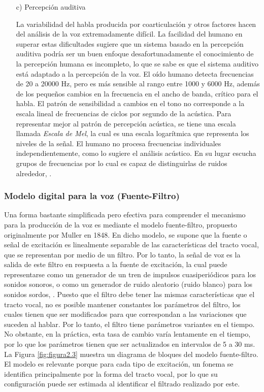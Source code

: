 \begin{enumerate}
\newpage
\item[c)]Percepción auditiva
\par
La variabilidad del habla producida por coarticulación y otros factores hacen del análisis de la voz extremadamente difícil.
\vskip 0.5cm
La facilidad del humano en superar estas dificultades sugiere que un sistema basado en la percepción auditiva podría ser un buen enfoque desafortunadamente el conocimiento de la percepción humana es incompleto, lo que se sabe es que el sistema auditivo está adaptado a la percepción de la voz.
\vskip 0.5cm
El oído humano detecta frecuencias de 20 a 20000 Hz, pero es más sensible al rango entre 1000 y 6000 Hz, además de los pequeños cambios en la frecuencia en el ancho de banda, crítico para el habla. El patrón de sensibilidad a cambios en el tono no corresponde a la escala lineal de frecuencias de ciclos por segundo de la acústica. Para representar mejor al patrón de percepción acústica, se tiene una escala llamada \textit{Escala de Mel}, la cual es una escala logarítmica que representa los niveles de la señal.
\vskip 0.5cm
El humano no procesa frecuencias individuales independientemente, como lo sugiere el análisis acústico. En su lugar escucha grupos de frecuencias por lo cual es capaz de distinguirlas de ruidos alrededor, \cite{eyra}.
\end{enumerate}

\subsubsection{Modelo digital para la voz (Fuente-Filtro)}
Una forma bastante simplificada pero efectiva para comprender el mecanismo para la producción de la voz es mediante el modelo fuente-filtro, propuesto originalmente por Muller en 1848. En dicho modelo, se supone que la fuente o señal de excitación es linealmente separable de las características del tracto vocal, que se representan por medio de un filtro. Por lo tanto, la señal de voz es la salida de este filtro en respuesta a la fuente de excitación, la cual puede representarse como un generador de un tren de impulsos cuasiperiódicos para los sonidos sonoros, o como un generador de ruido aleatorio (ruido blanco) para los sonidos sordos, \cite{rowden}.
\vskip 0.5cm
Puesto que el filtro debe tener las mismas características que el tracto vocal, no es posible mantener constantes los parámetros del filtro, los cuales tienen que ser modificados para que correspondan a las variaciones que suceden al hablar. Por lo tanto, el filtro tiene parámetros variantes en el tiempo. No obstante, en la práctica, esta tasa de cambio varía lentamente en el tiempo, por lo que los parámetros tienen que ser actualizados en intervalos de 5 a 30 ms.
\vskip 0.5cm
La Figura \ref{fig:figura2.3} muestra un diagrama de bloques del modelo fuente-filtro. El modelo es relevante porque para cada tipo de excitación, un fonema se identifica principalmente por la forma del tracto vocal, por lo que su configuración puede ser estimada al identificar el filtrado realizado por este.

